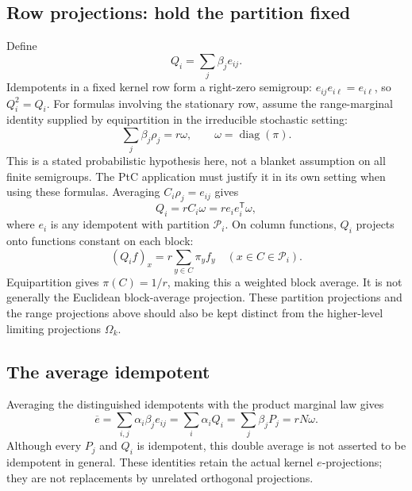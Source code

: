 \subsection{Row projections: hold the partition fixed}
Define
\[
 Q_i=\sum_j\beta_j e_{ij}.
\]
Idempotents in a fixed kernel row form a right-zero semigroup:
$e_{ij}e_{i\ell}=e_{i\ell}$, so $Q_i^2=Q_i$.
For formulas involving the stationary row, assume the range-marginal
identity supplied by equipartition in the irreducible stochastic setting:
\[
 \sum_j\beta_j\rho_j=r\omega,\qquad
 \omega=\operatorname{diag}(\pi).
\]
This is a stated probabilistic hypothesis here, not a blanket assumption
on all finite semigroups. The PtC application must justify it in its own
setting when using these formulas. Averaging $C_i\rho_j=e_{ij}$ gives
\[
 \boxed{Q_i=rC_i\omega=r e_i e_i^{\mathsf T}\omega,}
\]
where $e_i$ is any idempotent with partition $\mathcal P_i$.
On column functions, $Q_i$ projects onto functions constant on each block:
\[
 (Q_i f)_x=r\sum_{y\in C}\pi_y f_y\quad(x\in C\in\mathcal P_i).
\]
Equipartition gives $\pi(C)=1/r$, making this a weighted block average.
It is not generally the Euclidean block-average projection. These
partition projections and the range projections above should also be
kept distinct from the higher-level limiting projections $\Omega_k$.

\subsection{The average idempotent}
Averaging the distinguished idempotents with the product marginal law gives
\[
 \boxed{\overline e=\sum_{i,j}\alpha_i\beta_j e_{ij}
 =\sum_i\alpha_iQ_i=\sum_j\beta_jP_j=rN\omega.}
\]
Although every $P_j$ and $Q_i$ is idempotent, this double average is not
asserted to be idempotent in general. These identities retain the actual
kernel $e$-projections; they are not replacements by unrelated orthogonal
projections.

